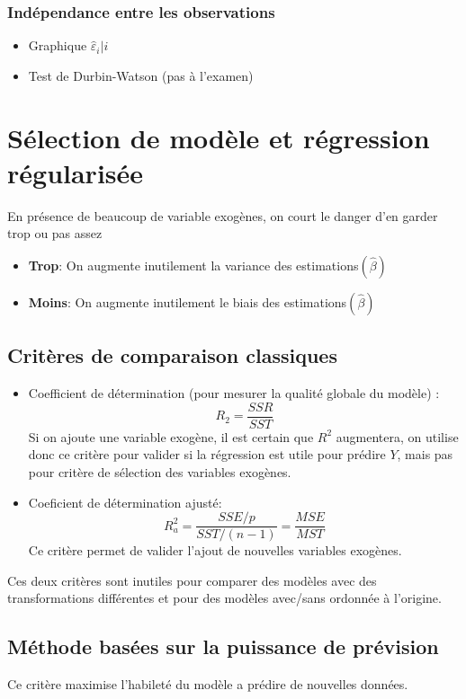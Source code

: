 \documentclass[10pt, french]{article}
\begin{document}
\begin{multicols*}{3}
\subsubsection*{Indépendance entre les observations}
\begin{itemize}
\item Graphique $\hat{\varepsilon}_i | i$
\item Test de Durbin-Watson (pas à l'examen)
\end{itemize}


\section{Sélection de modèle et régression régularisée}
En présence de beaucoup de variable exogènes, on court le danger d'en garder trop ou pas assez
\begin{itemize}
	\item \textbf{Trop}: On augmente inutilement la variance des estimations$(\hat{\beta})$
	\item \textbf{Moins}: On augmente inutilement le biais des estimations$(\hat{\beta})$
\end{itemize}

\subsection*{Critères de comparaison classiques}
\begin{itemize}
	\item Coefficient de détermination (pour mesurer la qualité globale du modèle) :
	\[ R_2 = \frac{SSR}{SST} \]
	Si on ajoute une variable exogène, il est certain que $R^2$ augmentera, on utilise donc ce critère pour valider si la régression est utile pour prédire $Y$, mais pas pour critère de sélection des variables exogènes.
	\item Coeficient de détermination ajusté:
	\[ R_a^2 = \frac{SSE / p}{SST / (n-1)} = \frac{MSE}{MST} \]
	Ce critère permet de valider l'ajout de nouvelles variables exogènes.
\end{itemize}
Ces deux critères sont inutiles pour comparer des modèles avec des transformations différentes et pour des modèles avec/sans ordonnée à l'origine.

\subsection*{Méthode basées sur la puissance de prévision}
Ce critère maximise l'habileté du modèle a prédire de nouvelles données.

\end{multicols*}
\end{document}
